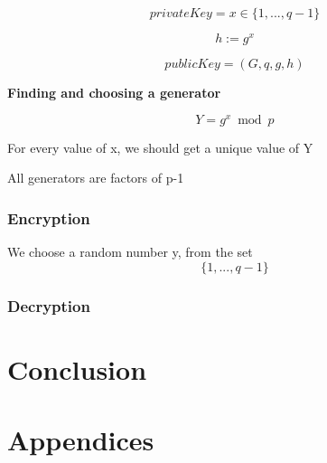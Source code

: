 \documentclass{article}
\begin{document}
\begin{equation}
privateKey = x \in \{1, ..., q-1\}
\end{equation}

\begin{equation}
h := g^{x}
\end{equation}

\begin{equation}
publicKey  = (G, q, g, h)
\end{equation}

\textbf{Finding and choosing a generator}

\begin{equation}
Y = g^{x} \bmod p
\end{equation}

	For every value of x, we should get a unique value of Y

	All generators are factors of p-1




\subsubsection{Encryption}

We choose a random number y, from the set
\begin{equation}
\{1, ..., q-1\}
\end{equation}


\subsubsection{Decryption}



\section{Conclusion}






\section{Appendices}


\newpage

\nocite{*}



\end{document}
